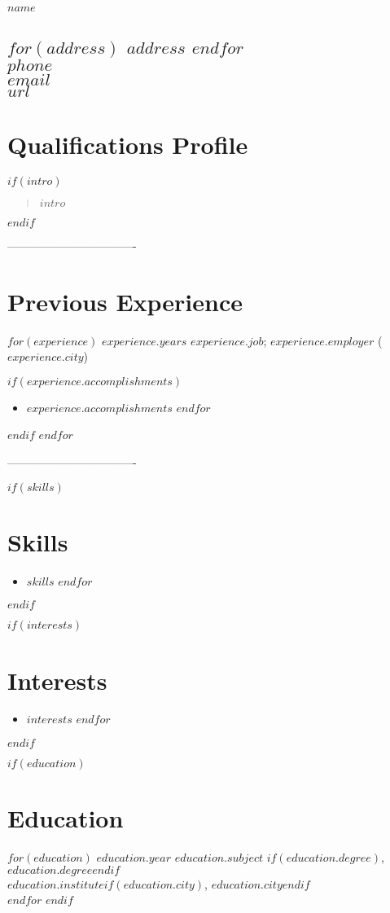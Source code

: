 \documentclass[$fontsize$, a4paper]{article}
\begin{document}
{\Huge $name$}
\vspace{-10pt}

\subsection*{
$for(address)$
$address$ 
$endfor$\\
$phone$ \\
\href{mailto:$email$}{$email$} \\
\href{http://$url$}{$url$}}
\vspace{5pt}

\section*{Qualifications Profile}
\vspace{-5pt}
$if(intro)$
\begin{quote}
{$intro$}
\end{quote}
$endif$

\centerline{----------------------------------}

\section*{Previous Experience}
\noindent
$for(experience)$
{\large $experience.years$}
\emph{$experience.job$};
\textsc{$experience.employer$} ($experience.city$)


$if(experience.accomplishments)$
\begin{itemize}
    $for(experience.accomplishments)$
      \item $experience.accomplishments$
    $endfor$
\end{itemize}
$endif$
$endfor$

\centerline{----------------------------------}

$if(skills)$
\section*{Skills}
\begin{itemize}
    $for(skills)$
      \item $skills$
    $endfor$
\end{itemize}
$endif$

$if(interests)$
\section*{Interests}
\begin{itemize}
    $for(interests)$
      \item $interests$
    $endfor$
\end{itemize}
$endif$


$if(education)$
\section*{Education}
\noindent
$for(education)$
\textsc{\large $education.year$}
\textbf{$education.subject$}
$if(education.degree)$, $education.degree$$endif$\\
\emph{$education.institute$}$if(education.city)$, $education.city$$endif$\\[.2cm]
$endfor$
$endif$
\end{document}
